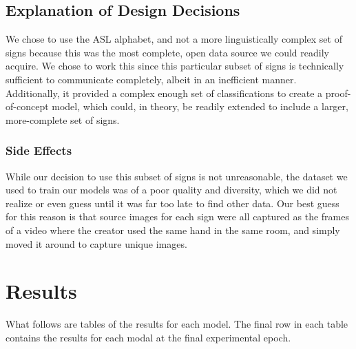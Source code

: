 \documentclass[10pt,Times New Roman]{article}
\begin{document}
    \subsection{Explanation of Design Decisions}
        We chose to use the ASL alphabet, and not a more linguistically complex set of signs
        because this was the most complete, open data source we could readily acquire. We 
        chose to work this since this particular subset of signs is technically sufficient
        to communicate completely, albeit in an inefficient manner. Additionally, it provided
        a complex enough set of classifications to create a proof-of-concept model, which
        could, in theory, be readily extended to include a larger, more-complete set of signs.

        \subsubsection{Side Effects}\label{sec:sideeffects}
            While our decision to use this subset of signs is not unreasonable, the dataset
            we used to train our models was of a poor quality and diversity, which we did
            not realize or even guess until it was far too late to find other data. Our best
            guess for this reason is that source images for each sign were all captured as
            the frames of a video where the creator used the same hand in the same room, and
            simply moved it around to capture unique images.

\section{Results}
    What follows are tables of the results for each model. The final row in each table contains
    the results for each modal at the final experimental epoch.
\end{document}
